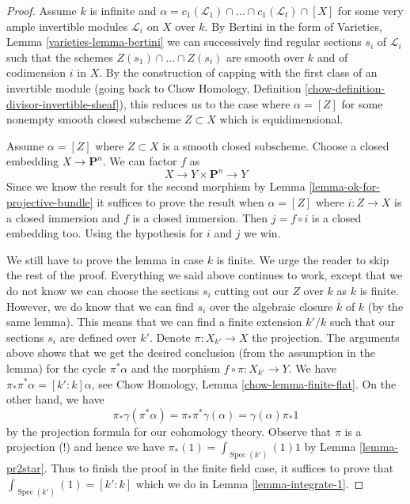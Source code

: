 \documentclass{stacks-project}
\theoremstyle{plain}
\theoremstyle{definition}
\theoremstyle{remark}
\numberwithin{equation}{subsection}
\def\Spec{\mathop{\mathrm{Spec}}}
\begin{document}
\begin{proof}
\medskip\noindent
Assume $k$ is infinite and $\alpha = 
c_1(\mathcal{L}_1) \cap \ldots \cap c_1(\mathcal{L}_t) \cap [X]$
for some very ample invertible modules $\mathcal{L}_i$ on $X$ over $k$.
By Bertini in the form of Varieties, Lemma \ref{varieties-lemma-bertini}
we can successively find regular sections $s_i$ of $\mathcal{L}_i$
such that the schemes $Z(s_1) \cap \ldots \cap Z(s_i)$
are smooth over $k$ and of codimension $i$ in $X$.
By the construction of capping with the first class of
an invertible module (going back to
Chow Homology, Definition \ref{chow-definition-divisor-invertible-sheaf}),
this reduces us to the case where $\alpha = [Z]$
for some nonempty smooth closed subscheme $Z \subset X$ which
is equidimensional.

\medskip\noindent
Assume $\alpha = [Z]$ where $Z \subset X$ is a smooth closed subscheme.
Choose a closed embedding $X \to \mathbf{P}^n$. We can factor $f$ as
$$
X \to Y \times \mathbf{P}^n \to Y
$$
Since we know the result for the second morphism by
Lemma \ref{lemma-ok-for-projective-bundle}
it suffices to prove the result when
$\alpha = [Z]$ where $i : Z \to X$ is a closed immersion 
and $f$ is a closed immersion.
Then $j = f \circ i$ is a closed embedding too.
Using the hypothesis for $i$ and $j$ we win.

\medskip\noindent
We still have to prove the lemma in case $k$ is finite. We urge the
reader to skip the rest of the proof. Everything we said above continues
to work, except that we do not know we can choose the sections
$s_i$ cutting out our $Z$ over $k$ as $k$ is finite. However, we do
know that we can find $s_i$ over the algebraic closure $\overline{k}$
of $k$ (by the same lemma). This means that we can
find a finite extension $k'/k$ such that our sections $s_i$
are defined over $k'$. Denote $\pi : X_{k'} \to X$ the projection.
The arguments above shows that we get the desired conclusion
(from the assumption in the lemma)
for the cycle $\pi^*\alpha$ and the morphism
$f \circ \pi : X_{k'} \to Y$.
We have $\pi_*\pi^*\alpha = [k' : k] \alpha$, see
Chow Homology, Lemma \ref{chow-lemma-finite-flat}.
On the other hand, we have
$$
\pi_*\gamma(\pi^*\alpha) = \pi_*\pi^*\gamma(\alpha) =
\gamma(\alpha) \pi_*1
$$
by the projection formula for our cohomology theory. Observe
that $\pi$ is a projection (!) and hence we have
$\pi_*(1) = \int_{\Spec(k')}(1) 1$ by
Lemma \ref{lemma-pr2star}. Thus to finish the proof in the
finite field case, it suffices to prove that
$\int_{\Spec(k')}(1) = [k' : k]$ which we do in
Lemma \ref{lemma-integrate-1}.
\end{proof}
\end{document}
